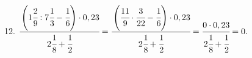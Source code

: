 12. $\cfrac{\left(1\cfrac{2}{9}:7\cfrac{1}{3}-\cfrac{1}{6}\right)\cdot0,23}{2\cfrac{1}{8}+\cfrac{1}{2}}=
\cfrac{\left(\cfrac{11}{9}\cdot\cfrac{3}{22}-\cfrac{1}{6}\right)\cdot0,23}{2\cfrac{1}{8}+\cfrac{1}{2}}=
\cfrac{0\cdot0,23}{2\cfrac{1}{8}+\cfrac{1}{2}}=0.$\\
